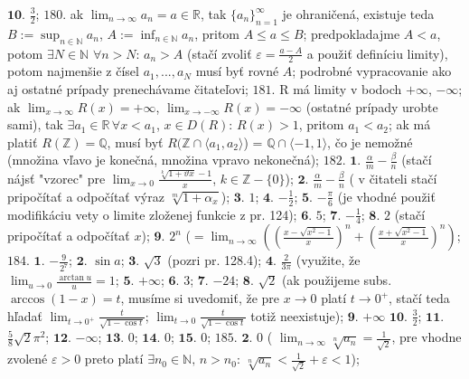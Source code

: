 $\boldsymbol{10.}$ $ \frac{3}{2}$;
$\boxed{180.}$ ak $\lim_{n \to \infty} a_{n}=a \in \mathbb{R} $, tak $\lbrace a_{n} \rbrace_{n=1} ^{\infty}$ je ohraničená, existuje teda $ B:= \sup_{n\in \mathbb{N}}a_{n} $, $A:= \inf_{n\in \mathbb{N}}a_{n} $, pritom $A \leq a\leq B $; predpokladajme $ A < a $, potom $ \exists N \in \mathbb{N} $  $ \forall n>N: \, a_{n}>A $ (stačí zvoliť $\varepsilon= \frac{a-A}{2} $ a použiť definíciu limity), potom najmenšie z čísel $a_{1},...,a_{N} $ musí byť rovné $A $; podrobné vypracovanie ako aj ostatné prípady prenechávame čitateľovi;
$\boxed{181.}$ R má limity v bodoch $+\infty$, $-\infty$; ak $\lim_{x \to \infty} R(x)=+\infty$,   $\lim_{x \to -\infty} R(x)=-\infty$ (ostatné prípady urobte sami), tak  $\exists a_{1} \in \mathbb{R} \, \forall x < a_{1}$, $x\in D(R):\, R(x)>1$, pritom $a_{1}< a_{2} $; ak má platiť  $ R(\mathbb{Z})=\mathbb{Q} $, musí byť $R( \mathbb{Z} \cap \langle a_{1}, a_{2}\rangle$) = $ \mathbb{Q} \cap \langle-1,1 \rangle$, čo je nemožné (množina vľavo je konečná, množina vpravo nekonečná);
$\boxed{182.}$ $\boldsymbol{1.}$ $ \frac{\alpha}{m} -\frac{\beta}{n}$ (stačí nájsť "vzorec" pre $ \lim_{x \to 0}\frac{\sqrt[k]{1+\vartheta x}-1}{x}$, $k\in \mathbb{Z}- \lbrace 0 \rbrace $);
$\boldsymbol{2.}$ $ \frac{\alpha}{m} -\frac{\beta}{n}$ ( v čitateli stačí pripočítať a odpočítať výraz  $\sqrt[m]{1+\alpha_{x}}$);
$\boldsymbol{3.}$ $1 $;
$\boldsymbol{4.}$ $-\frac{1}{2} $; 
$\boldsymbol{5.}$ $-\frac{\pi}{6} $ (je vhodné použiť modifikáciu vety o limite zloženej funkcie z pr. 124);
$\boldsymbol{6.}$ $5$;
$\boldsymbol{7.}$ $-\frac{1}{4} $;
$\boldsymbol{8.}$ $2 $ (stačí pripočítať a odpočítať $x$);
$\boldsymbol{9.}$ $2^{n}$ ($= \lim_{n \to \infty}((\frac{x-\sqrt{x^{2}-1}}{x})^{n} + (\frac{x+\sqrt{x^{2}-1}}{x})^{n}) $;
$\boxed{184.}$ $\boldsymbol{1.}$ $-\frac{9}{2^{7}} $; 
$\boldsymbol{2.}$ $\sin a $; 
$\boldsymbol{3.}$ $\sqrt{3} $ (pozri pr. 128.4); 
$\boldsymbol{4.}$ $\frac{2}{3\pi} $ (využite, že   $\lim_{u \to 0}\frac{\arctan u}{u}=1$; 
$\boldsymbol{5.}$ $+\infty $;
$\boldsymbol{6.}$ $3 $;
$\boldsymbol{7.}$ $-24 $;
$\boldsymbol{8.}$ $\sqrt{2} $ (ak použijeme subs. $\arccos (1-x)=t$, musíme si uvedomiť, že pre $x\rightarrow 0$ platí $t\rightarrow 0^{+}$, stačí teda hľadať $\lim_{t \to 0^{+}}\frac{t}{\sqrt{1-\cos t}}$;  $\lim_{t \to 0}\frac{t}{\sqrt{1-\cos t}}$ totiž neexistuje);
$\boldsymbol{9.}$  $+\infty $
$\boldsymbol{10.}$  $\frac{3}{2} $;
$\boldsymbol{11.}$  $\frac{5}{8}\sqrt{2}\pi ^{2}$;
$\boldsymbol{12.}$  $-\infty $;
$\boldsymbol{13.}$  $0 $;
$\boldsymbol{14.}$  $0 $;
$\boldsymbol{15.}$  $0 $;
$\boxed{185.}$ $\boldsymbol{2.}$  $0 $ (  $\lim_{n \to \infty}\sqrt[n]{a_{n}}= \frac{1}{\sqrt{2}} $, pre vhodne zvolené  $\varepsilon > 0 $ preto platí $\exists n_{0} \in \mathbb{N}, \, n>n_{0} $: $\sqrt[n]{a_{n}}<\frac{1}{\sqrt{2}}+\varepsilon < 1$); 
